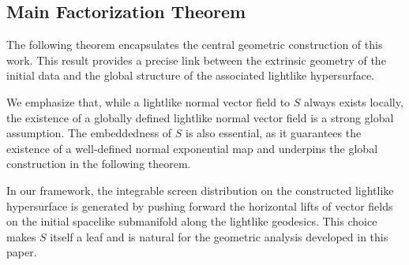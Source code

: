\documentclass[11pt]{article}
\numberwithin{equation}{section}
\begin{document}
	
	\subsection{Main Factorization Theorem}
	
The following theorem encapsulates the central geometric construction of this work. This result provides a precise link between the extrinsic geometry of the initial data and the global structure of the associated lightlike hypersurface.

We emphasize that, while a lightlike normal vector field to $S$ always exists locally, the existence of a globally defined lightlike normal vector field is a strong global assumption. The embeddedness of $S$ is also essential, as it guarantees the existence of a well-defined normal exponential map and underpins the global construction in the following theorem.

In our framework, the integrable screen distribution on the constructed lightlike hypersurface is generated by pushing forward the horizontal lifts of vector fields on the initial spacelike submanifold along the lightlike geodesics. This choice makes $S$ itself a leaf and is natural for the geometric analysis developed in this paper.
	
\end{document}
